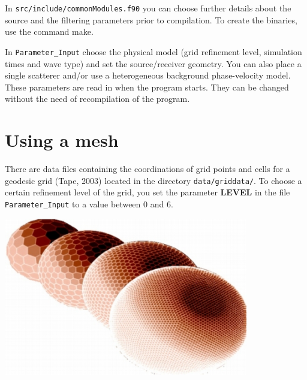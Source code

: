 \documentclass[a4paper,
                          headsepline,
                          listof=totoc,
                          toc=listof,
                          headings=small]{scrreprt} %
\begin{document}
In \texttt{src/include/commonModules.f90} you can choose further details about the source
and the filtering parameters prior to compilation. To create the binaries, use
the command \textsf{make}.


In \texttt{Parameter\_Input} choose the physical model (grid refinement level,
simulation times and wave type) and set the source/receiver geometry. You can also place
a single scatterer and/or use a heterogeneous background phase-velocity model. These
parameters are read in when the program starts. They can be changed without
the need of recompilation of the program.




\chapter{Using a mesh}
There are data files containing the coordinations of grid points and cells for a geodesic grid
({Tape}, 2003) located in the directory \texttt{data/griddata/}. To choose a certain refinement level
of the grid, you set the parameter \textbf{LEVEL} in the file \texttt{Parameter\_Input}
to a value between $0$ and $6$.

\vspace{2cm}
\begin{center}
\includegraphics[width=0.8\textwidth]{figures/spheres.jpg}
\end{center}



\end{document}
